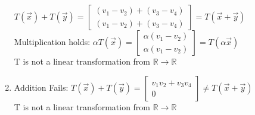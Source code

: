 \begin{enumerate}[label=(\alph*)]
    $T(\Vec{x})+ T(\Vec{y}) = \begin{bmatrix}
    (v_1-v_2)+(v_3-v_4) \\ (v_1 - v_2)+(v_3-v_4)
    \end{bmatrix} = T(\Vec{x} + \Vec{y})$
    \\
    Multiplication holds: 
    $\alpha T(\Vec{x}) = \begin{bmatrix}
    \alpha (v_1-v_2) \\
    \alpha (v_1-v_2)
    \end{bmatrix} = T (\alpha \Vec{x})$
    \\ T is not a linear transformation from $\mathbb{R} \to \mathbb{R}$
\item Addition Fails:
     $T(\Vec{x})+ T(\Vec{y}) = \begin{bmatrix}
     v_1v_2+v_3v_4 \\ 0
    \end{bmatrix} \ne T(\Vec{x} + \Vec{y})$
    \\ T is not a linear transformation from $\mathbb{R} \to \mathbb{R}$

\end{enumerate}